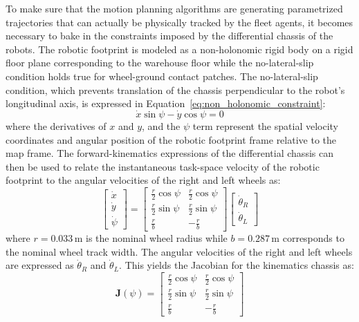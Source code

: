 To make sure that the motion planning algorithms are generating parametrized trajectories that can actually be physically tracked by the fleet agents, it becomes necessary to bake in the constraints imposed by the differential chassis of the robots. The robotic footprint is modeled as a non-holonomic rigid body on a rigid floor plane corresponding to the warehouse floor while the no-lateral-slip condition holds true for wheel-ground contact patches. The no-lateral-slip condition, which prevents translation of the chassis perpendicular to the robot's longitudinal axis, is expressed in Equation~\eqref{eq:non_holonomic_constraint}:
\begin{equation}
\dot{x}\sin\psi - \dot{y}\cos\psi = 0 \label{eq:non_holonomic_constraint}
\end{equation}
where the derivatives of $x$ and $y$, and the $\psi$ term represent the spatial velocity coordinates and angular position of the robotic footprint frame relative to the map frame. The forward-kinematics expressions of the differential chassis can then be used to relate the instantaneous task-space velocity of the robotic footprint to the angular velocities of the right and left wheels as:
\begin{equation}
\begin{bmatrix} \dot{x} \\ \dot{y} \\ \dot{\psi} \end{bmatrix} = \begin{bmatrix} \frac{r}{2}\cos\psi & \frac{r}{2}\cos\psi \\ \frac{r}{2}\sin\psi & \frac{r}{2}\sin\psi \\ \frac{r}{b} & -\frac{r}{b} \end{bmatrix} \begin{bmatrix} \dot{\theta}_R \\ \dot{\theta}_L \end{bmatrix} \label{eq:forward_kinematics_matrix}
\end{equation}
where $r = 0.033\,\text{m}$ is the nominal wheel radius while $b = 0.287\,\text{m}$ corresponds to the nominal wheel track width. The angular velocities of the right and left wheels are expressed as $\dot{\theta}_R$ and $\dot{\theta}_L$. This yields the Jacobian for the kinematics chassis as:
\begin{equation}
\mathbf{J}(\psi) = \begin{bmatrix} \frac{r}{2}\cos\psi & \frac{r}{2}\cos\psi \\ \frac{r}{2}\sin\psi & \frac{r}{2}\sin\psi \\ \frac{r}{b} & -\frac{r}{b} \end{bmatrix} \label{eq:chassis_jacobian}
\end{equation}
